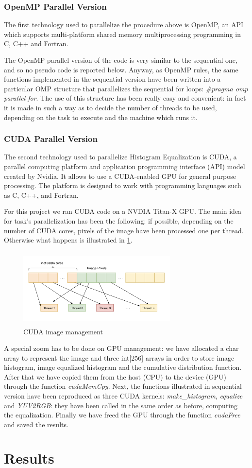 \documentclass[10pt,twocolumn,letterpaper]{article}
\begin{document}
\subsubsection{OpenMP Parallel Version}
The first technology used to parallelize the procedure above is OpenMP, an API which supports multi-platform shared memory multiprocessing programming in C, C++ and Fortran. 

The OpenMP parallel version of the code is very similar to the sequential one, and so no pseudo code is reported below. Anyway, as OpenMP rules, the same functions implemented in the sequential version have been written into a particular OMP structure that parallelizes the sequential for loops: \textit{\#pragma omp parallel for}. The use of this structure has been really easy and convenient: in fact it is made in such a way as to decide the number of threads to be used, depending on the task to execute and the machine which runs it.

\subsubsection{CUDA Parallel Version}
The second technology used to parallelize Histogram Equalization is CUDA, a parallel computing platform and application programming interface (API) model created by Nvidia. It allows to use a CUDA-enabled GPU for general purpose processing. The platform is designed to work with programming languages such as C, C++, and Fortran. 

For this project we ran CUDA code on a NVDIA Titan-X GPU. The main idea for task's parallelization has been the following: if possible, depending on the number of CUDA cores, pixels of the image have been processed one per thread. Otherwise what happens is illustrated in \ref{fig:shared}.

\begin{figure}[h]
	\centering
	\includegraphics[width=8cm, height=4cm]{shared}
	\caption{CUDA image management}
	\label{fig:shared}
\end{figure}

A special zoom has to be done on GPU management: we have allocated a char array to represent the image and three int[256] arrays in order to store image histogram, image equalized histogram and the cumulative distribution function. After that we have copied them from the host (CPU) to the device (GPU) through the function \textit{cudaMemCpy}. Next, the functions illustrated in sequential version have been reproduced as three CUDA kernels: \textit{make\_histogram}, \textit{equalize} and \textit{YUV2RGB}: they have been called in the same order as before, computing the equalization. Finally we have freed the GPU through the function \textit{cudaFree} and saved the results.

\section{Results}
\end{document}
